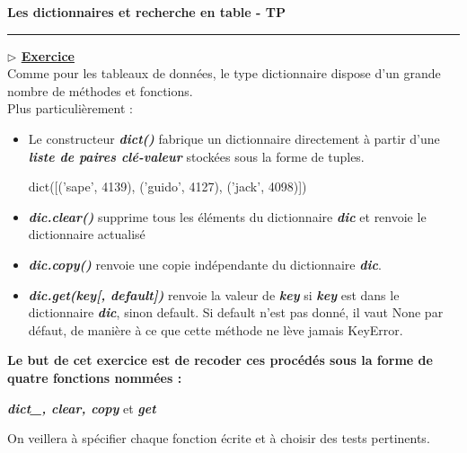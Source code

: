 \documentclass[12pt,french]{article}
\newcounter{npb}
\newcommand{\exo}{
    \stepcounter{npb}
    {\textbf{$\triangleright$ \underline{Exercice \arabic{npb} }}}
}
\newcounter{sf}
\begin{document}
    \chead{}
      \renewcommand{\headrulewidth}{0.5pt}
      \lfoot{                      }
    \pagestyle{fancy}
    \renewcommand{\footrulewidth}{0.4pt}
\begin{center}
\textbf{\Large{Les dictionnaires et recherche en table - TP}}\end{center}
\hrule
\vskip0.1cm
\exo\\
Comme pour les tableaux de données, le type dictionnaire dispose d'un grande nombre de méthodes et fonctions.\\ Plus particulièrement :
\begin{itemize}[$\bullet$]
\item Le constructeur \textbf{\textsl{dict() }} fabrique un dictionnaire directement à partir d'une \textbf{\textsl{liste de paires clé-valeur}} stockées sous la forme de tuples.\\
\begin{tcolorbox}[enhanced,colback=blue!5!white,colframe=blue!75!black]	
\begin{pyconsole}
dict([('sape', 4139), ('guido', 4127), ('jack', 4098)])
\end{pyconsole}
\end{tcolorbox}
\item \textbf{\textsl{dic.clear()}} supprime tous les éléments du dictionnaire \textbf{\textsl{dic}} et renvoie le dictionnaire actualisé
\item \textbf{\textsl{ dic.copy() }} renvoie une copie indépendante du dictionnaire \textbf{\textsl{dic}}.
\item \textbf{\textsl{dic.get(key[, default]) } } renvoie la valeur de \textbf{\textsl{key}} si \textbf{\textsl{key}} est dans le dictionnaire \textbf{\textsl{dic}}, sinon default. Si default n'est pas donné, il vaut None par défaut, de manière à ce que cette méthode ne lève jamais KeyError.
\end{itemize}
\textbf{Le but de cet exercice est de recoder ces procédés sous la forme de quatre fonctions nommées :}
\begin{center}
\textbf{\textsl{dict\_, clear, copy}} et \textbf{\textsl{get}}
\end{center}
On veillera à spécifier chaque fonction écrite et à choisir des tests pertinents.\\
\end{document}
